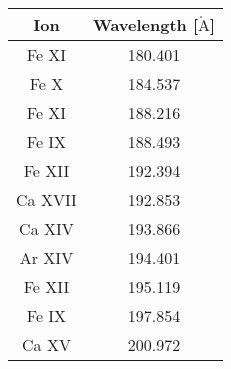 \begin{tabular}{|c|c|}
\hline
Ion & Wavelength [$\mathrm{\mathring{A}}$] \\
\hline\hline
Fe XI & 180.401 \\
Fe X & 184.537 \\
Fe XI & 188.216 \\
Fe IX & 188.493 \\
Fe XII & 192.394 \\
Ca XVII & 192.853 \\
Ca XIV & 193.866 \\
Ar XIV & 194.401 \\
Fe XII & 195.119 \\
Fe IX & 197.854 \\
Ca XV & 200.972 \\
\hline
\end{tabular}
